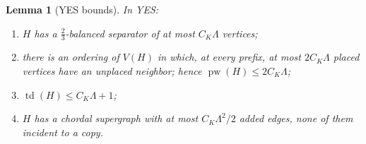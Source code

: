 \documentclass[11pt,letterpaper]{article}
\newtheorem{lemma}[theorem]{Lemma}
\theoremstyle{definition}
\theoremstyle{remark}
\DeclareMathOperator{\pw}{pw}
\DeclareMathOperator{\td}{td}
\begin{document}
\begin{lemma}[YES bounds]\label{lem:sepYES}
In YES:
\begin{enumerate}[label=\textup{(\alph*)}]
\item \(H\) has a \(\tfrac23\)-balanced separator of at most \(C_K\Lambda\)
vertices;
\item there is an ordering of \(V(H)\) in which, at every prefix, at most
\(2C_K\Lambda\) placed vertices have an unplaced neighbor; hence
\(\pw(H)\le2C_K\Lambda\);
\item \(\td(H)\le C_K\Lambda+1\);
\item \(H\) has a chordal supergraph with at most \(C_K\Lambda^2/2\) added
edges, none of them incident to a copy.
\end{enumerate}
\end{lemma}
\end{document}
